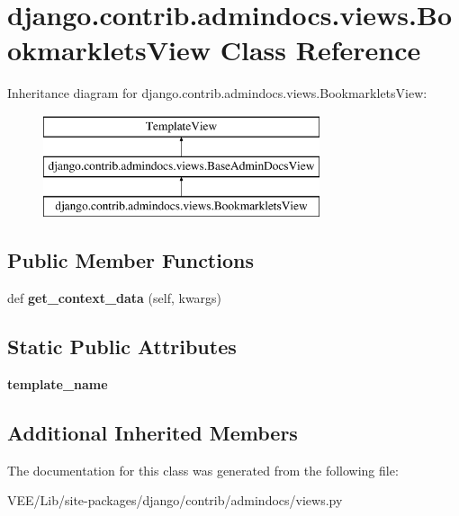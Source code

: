 \hypertarget{classdjango_1_1contrib_1_1admindocs_1_1views_1_1_bookmarklets_view}{}\section{django.\+contrib.\+admindocs.\+views.\+Bookmarklets\+View Class Reference}
\label{classdjango_1_1contrib_1_1admindocs_1_1views_1_1_bookmarklets_view}
Inheritance diagram for django.\+contrib.\+admindocs.\+views.\+Bookmarklets\+View\+:\begin{figure}[H]
\begin{center}
\leavevmode
\includegraphics[height=3.000000cm]{classdjango_1_1contrib_1_1admindocs_1_1views_1_1_bookmarklets_view}
\end{center}
\end{figure}
\subsection*{Public Member Functions}
\begin{DoxyCompactItemize}
\item 
\mbox{\label{classdjango_1_1contrib_1_1admindocs_1_1views_1_1_bookmarklets_view_afeaabaf329dba003a133442b4956bfe8}} 
def {\bfseries get\+\_\+context\+\_\+data} (self, kwargs)
\end{DoxyCompactItemize}
\subsection*{Static Public Attributes}
\begin{DoxyCompactItemize}
\item 
\mbox{\label{classdjango_1_1contrib_1_1admindocs_1_1views_1_1_bookmarklets_view_a69ea2a2636ab2415612b13bc1ed409ca}} 
{\bfseries template\+\_\+name}
\end{DoxyCompactItemize}
\subsection*{Additional Inherited Members}


The documentation for this class was generated from the following file\+:\begin{DoxyCompactItemize}
\item 
V\+E\+E/\+Lib/site-\/packages/django/contrib/admindocs/views.\+py\end{DoxyCompactItemize}
